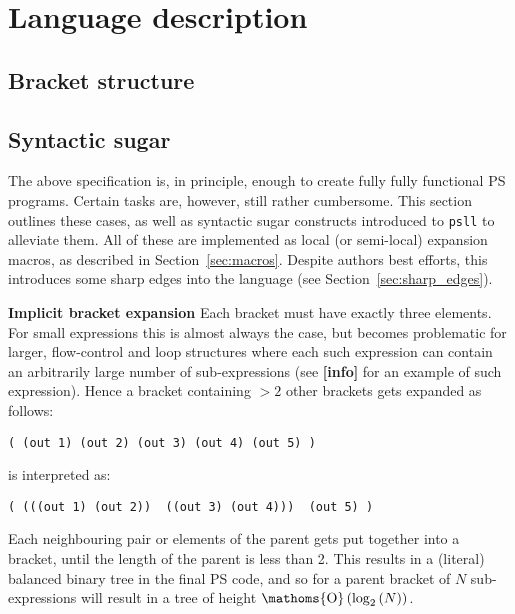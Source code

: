 \documentclass[aip,jcp,reprint]{revtex4-1}
\DeclareMathOperator{\bigO}{\ensuremath{\mathoms{O}}}
\newcommand\plinfo{{\color[rgb]{0.929,0.694,0.125}\textbf{[info]}}\xspace}
\newcommand\psll{\texttt{psll}\xspace}
\begin{document}
\cite{dbeaz2018}

\lipsum[1-5]

\section{Language description}
\subsection{Bracket structure}

\subsection{Syntactic sugar}\label{sec:sugar}
The above specification is, in principle, enough to create fully fully functional PS programs. Certain tasks are, however, still rather cumbersome. This section outlines these cases, as well as syntactic sugar constructs introduced to \psll to alleviate them. All of these are implemented as local (or semi-local) expansion macros, as described in Section~\ref{sec:macros}. Despite authors best efforts, this introduces some sharp edges into the language (see Section~\ref{sec:sharp_edges}).

\textbf{Implicit bracket expansion} Each bracket must have exactly three elements. For small expressions this is almost always the case, but becomes problematic for larger, flow-control and loop structures where each such expression can contain an arbitrarily large number of sub-expressions (see \plinfo for an example of such expression). Hence a bracket containing $>2$ other brackets gets expanded as follows:
\begin{lstlisting}[language=psll,aboveskip=3pt,belowskip=-2pt]
( (out 1) (out 2) (out 3) (out 4) (out 5) )
\end{lstlisting}
is interpreted as:
\begin{lstlisting}[language=psll,aboveskip=3pt,belowskip=-2pt]
( (((out 1) (out 2))  ((out 3) (out 4)))  (out 5) )
\end{lstlisting}
Each neighbouring pair or elements of the parent gets put together into a bracket, until the length of the parent is less than 2. This results in a (literal) balanced binary tree in the final PS code, and so for a parent bracket of $N$ sub-expressions will result in a tree of height $\bigO\left(\log_2\left(N\right)\right)$.
\end{document}
